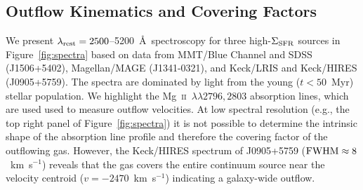 \documentclass[apj]{emulateapj}
\newcommand{\kms}{km~s$^{-1}$}
\newcommand{\mgii}{\textrm{Mg}~\textsc{ii}}
\newcommand{\lrest}{\lambda_{\textnormal{\scriptsize{rest}}}}
\newcommand{\sigmasfr}{\Sigma_{\textnormal{\scriptsize{SFR}}}}
\begin{document}
\subsection{Outflow Kinematics and Covering Factors}

We present $\lrest=2500$--5200~\AA\ spectroscopy for three
high-$\sigmasfr$ sources in Figure~\ref{fig:spectra} based on data
from MMT/Blue Channel and SDSS (J1506+5402), Magellan/MAGE
(J1341-0321), and Keck/LRIS and Keck/HIRES (J0905+5759).  The spectra
are dominated by light from the young ($t<50$~Myr) stellar population.
We highlight the \mgii~$\lambda\lambda2796,2803$ absorption lines,
which are used used to measure outflow velocities.  At low spectral
resolution (e.g., the top right panel of Figure~\ref{fig:spectra}) it
is not possible to determine the intrinsic shape of the absorption
line profile and therefore the covering factor of the outflowing gas.
However, the Keck/HIRES spectrum of J0905+5759
($\textnormal{FWHM}\approx8$~\kms) reveals that the gas covers the
entire continuum source near the velocity centroid ($v=-2470$~\kms)
indicating a galaxy-wide outflow.





%
%
%




\end{document}
